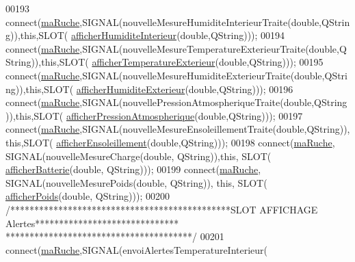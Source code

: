 \begin{DoxyCode}
00193         connect(\hyperlink{class_ruche_ihm_a43a6b1fa31f4fba58d919daae3707b38}{maRuche},SIGNAL(nouvelleMesureHumiditeInterieurTraite(\textcolor{keywordtype}{double},QString)),\textcolor{keyword}{this},SLOT(
      \hyperlink{class_ruche_ihm_a4ab4b1ba1618a9aaf5bdb7f51df987aa}{afficherHumiditeInterieur}(\textcolor{keywordtype}{double},QString)));
00194         connect(\hyperlink{class_ruche_ihm_a43a6b1fa31f4fba58d919daae3707b38}{maRuche},SIGNAL(nouvelleMesureTemperatureExterieurTraite(\textcolor{keywordtype}{double},QString)),\textcolor{keyword}{this},SLOT(
      \hyperlink{class_ruche_ihm_a63e3a82b98678d00d57748e80fe5258b}{afficherTemperatureExterieur}(\textcolor{keywordtype}{double},QString)));
00195         connect(\hyperlink{class_ruche_ihm_a43a6b1fa31f4fba58d919daae3707b38}{maRuche},SIGNAL(nouvelleMesureHumiditeExterieurTraite(\textcolor{keywordtype}{double},QString)),\textcolor{keyword}{this},SLOT(
      \hyperlink{class_ruche_ihm_a6381018a7dc88cb966d7bbc49515495e}{afficherHumiditeExterieur}(\textcolor{keywordtype}{double},QString)));
00196         connect(\hyperlink{class_ruche_ihm_a43a6b1fa31f4fba58d919daae3707b38}{maRuche},SIGNAL(nouvellePressionAtmospheriqueTraite(\textcolor{keywordtype}{double},QString)),\textcolor{keyword}{this},SLOT(
      \hyperlink{class_ruche_ihm_ab38e4be7a1f39c862d7d8ab2ed3de98e}{afficherPressionAtmospherique}(\textcolor{keywordtype}{double},QString)));
00197         connect(\hyperlink{class_ruche_ihm_a43a6b1fa31f4fba58d919daae3707b38}{maRuche},SIGNAL(nouvelleMesureEnsoleillementTraite(\textcolor{keywordtype}{double},QString)),\textcolor{keyword}{this},SLOT(
      \hyperlink{class_ruche_ihm_a8ee0041a209452e8e77f4a50adabff2b}{afficherEnsoleillement}(\textcolor{keywordtype}{double},QString)));
00198         connect(\hyperlink{class_ruche_ihm_a43a6b1fa31f4fba58d919daae3707b38}{maRuche}, SIGNAL(nouvelleMesureCharge(\textcolor{keywordtype}{double}, QString)),\textcolor{keyword}{this}, SLOT(
      \hyperlink{class_ruche_ihm_a3934082a49b22f4c6096d96887a11591}{afficherBatterie}(\textcolor{keywordtype}{double}, QString)));
00199         connect(\hyperlink{class_ruche_ihm_a43a6b1fa31f4fba58d919daae3707b38}{maRuche}, SIGNAL(nouvelleMesurePoids(\textcolor{keywordtype}{double}, QString)), \textcolor{keyword}{this}, SLOT(
      \hyperlink{class_ruche_ihm_a840ab51f951632e630f92e6c0b5ecc4d}{afficherPoids}(\textcolor{keywordtype}{double}, QString)));
00200         \textcolor{comment}{/**********************************************SLOT AFFICHAGE Alertes******************************
      ***************************************/}
00201         connect(\hyperlink{class_ruche_ihm_a43a6b1fa31f4fba58d919daae3707b38}{maRuche},SIGNAL(envoiAlertesTemperatureInterieur(

\end{DoxyCode}
